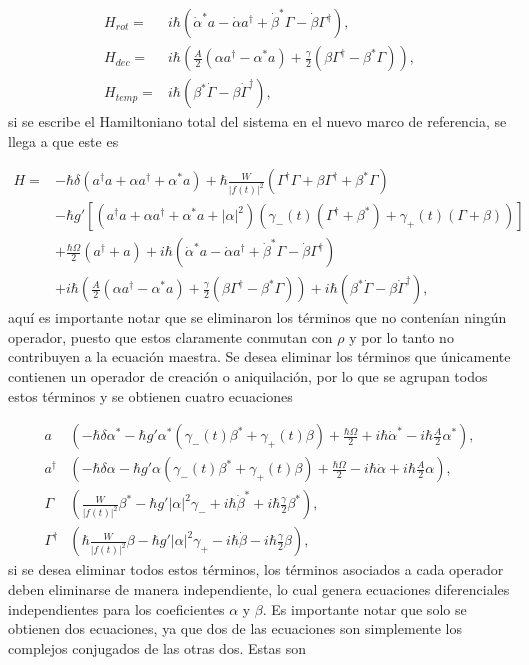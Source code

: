 \documentclass[10pt,a4paper]{report}
\begin{document}
\begin{align}
H_{rot} =& i\hbar(\dot{\alpha}^*a-\dot{\alpha}a^\dagger+\dot{\beta}^*\Gamma-\dot{\beta}\Gamma^\dagger),\\
H_{dec} =& i\hbar(\frac{A}{2}(\alpha a^\dagger - \alpha^*a)+\frac{\gamma}{2}(\beta\Gamma^{\dagger}-\beta^* \Gamma)),\\
H_{temp}=& i\hbar(\beta^*\dot{\Gamma} - \beta \dot{\Gamma}^\dagger),
\end{align} si se escribe el Hamiltoniano total del sistema en el nuevo marco de referencia, se llega a que este es

\begin{align*}
H =& -\hbar \delta(a^{\dagger}a +\alpha a^{\dagger}+\alpha^* a)+\hbar\frac{W}{|f(t)|^2}(\Gamma^{\dagger}\Gamma + \beta \Gamma^{\dagger} + \beta^* \Gamma)\\
 &-\hbar g'[(a^{\dagger}a +\alpha a^{\dagger}+\alpha^* a + |\alpha|^2)(\gamma_-(t)(\Gamma^{\dagger}+\beta^*)+\gamma_+(t)(\Gamma+\beta))]\\
 &+\frac{\hbar \Omega}{2}(a^{\dagger} + a)+i\hbar(\dot{\alpha}^*a-\dot{\alpha}a^\dagger+\dot{\beta}^*\Gamma-\dot{\beta}\Gamma^\dagger)\\
 &+i\hbar(\frac{A}{2}(\alpha a^\dagger - \alpha^*a)+\frac{\gamma}{2}(\beta\Gamma^{\dagger}-\beta^* \Gamma))+i\hbar(\beta^*\dot{\Gamma} - \beta \dot{\Gamma}^\dagger),
\end{align*} aquí es importante notar que se eliminaron los términos que no contenían ningún operador, puesto que estos claramente conmutan con $\rho$ y por lo tanto no contribuyen a la ecuación maestra. Se desea eliminar los términos que únicamente contienen un operador de creación o aniquilación, por lo que se agrupan todos estos términos y se obtienen cuatro ecuaciones

\begin{align}
a&(-\hbar\delta\alpha^* -\hbar g' \alpha^*(\gamma_-(t) \beta^* + \gamma_+(t) \beta)+ \frac{\hbar\Omega}{2} + i\hbar\dot{\alpha}^* -i\hbar\frac{A}{2}\alpha^*),\\
a^\dagger&(-\hbar\delta\alpha -\hbar g' \alpha(\gamma_-(t) \beta^* + \gamma_+(t) \beta)+ \frac{\hbar\Omega}{2} - i\hbar\dot{\alpha} +i\hbar\frac{A}{2}\alpha),\\
\Gamma&(\frac{W}{|f(t)|^2}\beta^*-\hbar g'|\alpha|^2\gamma_- +  i\hbar\dot{\beta}^*+i\hbar\frac{\gamma}{2}\beta^*),\\
\Gamma^\dagger&(\hbar\frac{W}{|f(t)|^2}\beta-\hbar g'|\alpha|^2\gamma_+ -  i\hbar\dot{\beta}-i\hbar\frac{\gamma}{2}\beta),
\end{align} si se desea eliminar todos estos términos, los términos asociados a cada operador deben eliminarse de manera independiente, lo cual genera ecuaciones diferenciales independientes para los coeficientes $\alpha$ y $\beta$. Es importante notar que solo se obtienen dos ecuaciones, ya que dos de las ecuaciones son simplemente los complejos conjugados de las otras dos. Estas son
\end{document}

